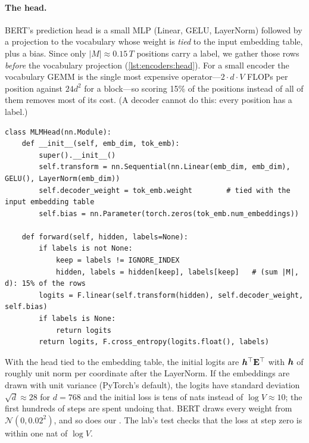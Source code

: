 \paragraph{The head.} BERT's prediction head is a small MLP (Linear, GELU, LayerNorm) followed by a
projection to the vocabulary whose weight is \emph{tied} to the input embedding table, plus a bias.
Since only $|M|\approx0.15\,T$ positions carry a label, we gather those rows \emph{before} the
vocabulary projection (\cref{lst:encoders:head}). For a small encoder the vocabulary GEMM is the single
most expensive operator---$2\cdot d\cdot V$ FLOPs per position against $24d^2$ for a block---so
scoring 15\% of the positions instead of all of them removes most of its cost. (A decoder cannot do
this: every position has a label.)

\begin{lstlisting}[caption={The MLM head scores only the selected positions.},label={lst:encoders:head}]
class MLMHead(nn.Module):
    def __init__(self, emb_dim, tok_emb):
        super().__init__()
        self.transform = nn.Sequential(nn.Linear(emb_dim, emb_dim), GELU(), LayerNorm(emb_dim))
        self.decoder_weight = tok_emb.weight        # tied with the input embedding table
        self.bias = nn.Parameter(torch.zeros(tok_emb.num_embeddings))

    def forward(self, hidden, labels=None):
        if labels is not None:
            keep = labels != IGNORE_INDEX
            hidden, labels = hidden[keep], labels[keep]   # (sum |M|, d): 15% of the rows
        logits = F.linear(self.transform(hidden), self.decoder_weight, self.bias)
        if labels is None:
            return logits
        return logits, F.cross_entropy(logits.float(), labels)
\end{lstlisting}

\begin{pitfall}
With the head tied to the embedding table, the initial logits are $\bm{h}^\top \mathbf{E}^\top$ with
$\bm{h}$ of roughly unit norm per coordinate after the LayerNorm. If the embeddings are drawn with
unit variance (PyTorch's  default), the logits have standard deviation
$\sqrt d\approx 28$ for $d=768$ and the initial loss is tens of nats instead of $\log V\approx 10$;
the first hundreds of steps are spent undoing that. BERT draws every weight from
$\mathcal N(0,0.02^2)$, and so does our . The lab's test checks that the loss at
step zero is within one nat of $\log V$.
\end{pitfall}


